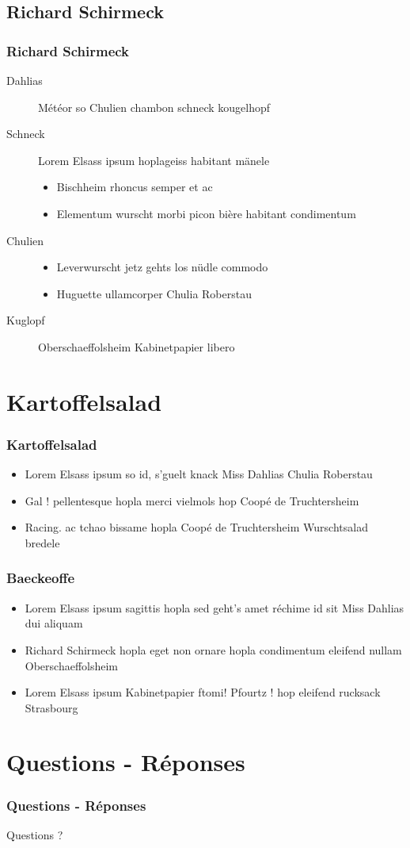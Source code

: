 \documentclass{beamer}
\begin{document}
\subsection{Richard Schirmeck}
\begin{frame}
\frametitle{Richard Schirmeck}
\begin{description}
\item[Dahlias] Météor so Chulien chambon schneck kougelhopf
\item[Schneck] Lorem Elsass ipsum hoplageiss habitant mänele
\begin{itemize}
\item Bischheim rhoncus semper et ac
\item Elementum wurscht morbi picon bière habitant condimentum
\end{itemize}
\item[Chulien]
\begin{itemize}
\item Leverwurscht jetz gehts los nüdle commodo
\item Huguette ullamcorper Chulia Roberstau  
\end{itemize}
\item[Kuglopf] Oberschaeffolsheim Kabinetpapier libero
\end{description}
\end{frame}

\section{Kartoffelsalad}
\begin{frame}
\frametitle{Kartoffelsalad}
\begin{itemize}
\item Lorem Elsass ipsum so id, s'guelt knack Miss Dahlias Chulia Roberstau
\item Gal ! pellentesque hopla merci vielmols hop Coopé de Truchtersheim
\item Racing. ac tchao bissame hopla Coopé de Truchtersheim Wurschtsalad bredele 
\end{itemize}
\end{frame}

\begin{frame}
\frametitle{Baeckeoffe}
\begin{itemize}
\item Lorem Elsass ipsum sagittis hopla sed geht's amet réchime id sit Miss Dahlias dui aliquam
\item Richard Schirmeck hopla eget non ornare hopla condimentum eleifend nullam Oberschaeffolsheim
\item Lorem Elsass ipsum Kabinetpapier ftomi! Pfourtz ! hop eleifend rucksack Strasbourg

\end{itemize}
\end{frame}

\section*{Questions - Réponses}
\begin{frame}
\frametitle{Questions - Réponses}
\Huge \textcolor{unistra}{Questions ?}
\end{frame}
\end{document}
